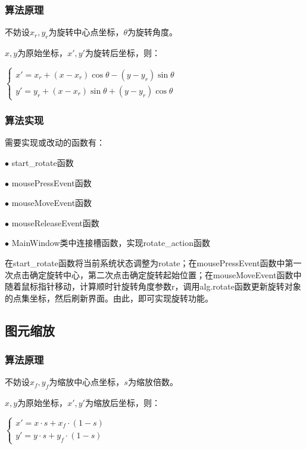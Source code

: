 \documentclass[a4paper,UTF8]{article}
\theoremstyle{definition}
\begin{document}
\subsubsection{算法原理}

不妨设$x_r,y_r$为旋转中心点坐标，$\theta$为旋转角度。

$x,y$为原始坐标，$x',y'$为旋转后坐标，则：

\begin{center}
	$
	\begin{cases}  
		x'=x_r+(x-x_r)\cos\theta - (y-y_r)\sin\theta \\
		y'=y_r+(x-x_r)\sin\theta + (y-y_r)\cos\theta 
	\end{cases} 
	$
\end{center}

\subsubsection{算法实现}

需要实现或改动的函数有：

$\bullet$ start\_rotate函数

$\bullet$ mousePressEvent函数

$\bullet$ mouseMoveEvent函数

$\bullet$ mouseReleaseEvent函数

$\bullet$ MainWindow类中连接槽函数，实现rotate\_action函数

在start\_rotate函数将当前系统状态调整为rotate；在mousePressEvent函数中第一次点击确定旋转中心，第二次点击确定旋转起始位置；在mouseMoveEvent函数中随着鼠标指针移动，计算顺时针旋转角度参数r，调用alg.rotate函数更新旋转对象的点集坐标，然后刷新界面。由此，即可实现旋转功能。

\subsection{图元缩放}

\subsubsection{算法原理}

不妨设$x_f,y_f$为缩放中心点坐标，$s$为缩放倍数。

$x,y$为原始坐标，$x',y'$为缩放后坐标，则：

\begin{center}
	$
	\begin{cases}  
		x'=x\cdot s + x_f\cdot (1-s) \\
		y'=y\cdot s + y_f\cdot (1-s) 
	\end{cases} 
	$
\end{center}
\end{document}
